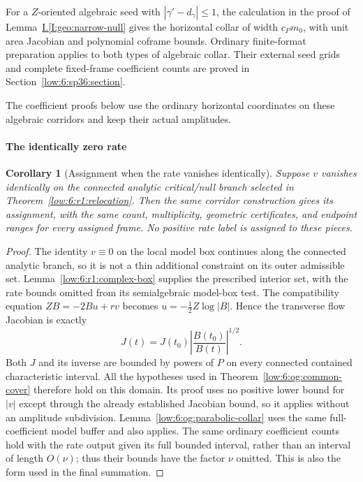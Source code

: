 \documentclass[11pt]{amsart}
\newtheorem{corollary}[theorem]{Corollary}
\theoremstyle{definition}
\theoremstyle{remark}
\numberwithin{equation}{section}
\newcommand{\partIref}[1]{\hyperref[I:#1]{I.\ref*{I:#1}}}
\begin{document}
For a $Z$-oriented algebraic seed with $|\gamma'-d_\gamma|\le1$, the calculation in the proof of Lemma~\partIref{geo:narrow-null} gives the horizontal collar of width $c_Pm_0$, with unit area Jacobian and polynomial coframe bounds. Ordinary finite-format preparation applies to both types of algebraic collar. Their external seed grids and complete fixed-frame coefficient counts are proved in Section~\ref{low:6:sp36:section}.


The coefficient proofs below use the ordinary horizontal coordinates on these algebraic corridors and keep their actual amplitudes.

\paragraph{The identically zero rate}

\begin{corollary}[Assignment when the rate vanishes identically]\label{low:6:r1:zero-common}
Suppose $v$ vanishes identically on the connected analytic critical/null branch selected in Theorem~\ref{low:6:r1:relocation}. Then the same corridor construction gives its assignment, with the same count, multiplicity, geometric certificates, and endpoint ranges for every assigned frame. No positive rate label is assigned to these pieces.
\end{corollary}
\begin{proof}
The identity $v\equiv0$ on the local model box continues along the connected analytic branch, so it is not a thin additional constraint on its outer admissible set. Lemma~\ref{low:6:r1:complex-box} supplies the prescribed interior set, with the rate bounds omitted from its semialgebraic model-box test. The compatibility equation $ZB=-2Bu+rv$ becomes $u=-\tfrac12Z\log|B|$. Hence the transverse flow Jacobian is exactly
\[
J(t)=J(t_0)\left|\frac{B(t_0)}{B(t)}\right|^{1/2}.
\]
Both $J$ and its inverse are bounded by powers of $P$ on every connected contained characteristic interval. All the hypotheses used in Theorem~\ref{low:6:og:common-cover} therefore hold on this domain. Its proof uses no positive lower bound for $|v|$ except through the already established Jacobian bound, so it applies without an amplitude subdivision. Lemma~\ref{low:6:og:parabolic-collar} uses the same full-coefficient model buffer and also applies. The same ordinary coefficient counts hold with the rate output given its full bounded interval, rather than an interval of length $O(\nu)$; thus their bounds have the factor $\nu$ omitted. This is also the form used in the final summation.
\end{proof}
\end{document}
